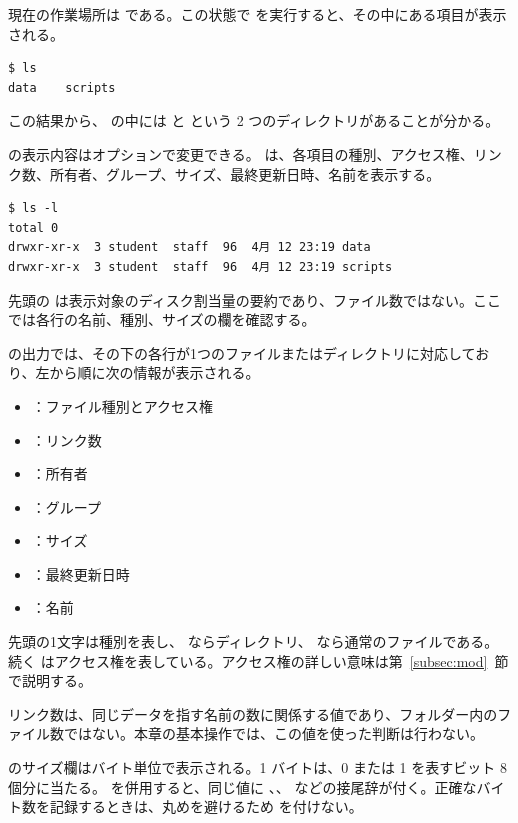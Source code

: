 現在の作業場所は  である。この状態で  を実行すると、その中にある項目が表示される。

\begin{lstlisting}[numbers=none, xleftmargin=2\zw]
$ ls
data	scripts
\end{lstlisting}

この結果から、 の中には  と  という 2 つのディレクトリがあることが分かる。

 の表示内容はオプションで変更できる。 は、各項目の種別、アクセス権、リンク数、所有者、グループ、サイズ、最終更新日時、名前を表示する。

\begin{lstlisting}[numbers=none, xleftmargin=2\zw]
$ ls -l
total 0
drwxr-xr-x  3 student  staff  96  4月 12 23:19 data
drwxr-xr-x  3 student  staff  96  4月 12 23:19 scripts
\end{lstlisting}

先頭の  は表示対象のディスク割当量の要約であり、ファイル数ではない。ここでは各行の名前、種別、サイズの欄を確認する。

 の出力では、その下の各行が1つのファイルまたはディレクトリに対応しており、左から順に次の情報が表示される。

\begin{itemize}
  \item {}：ファイル種別とアクセス権
  \item {}：リンク数
  \item {}：所有者
  \item {}：グループ
  \item {}：サイズ
  \item {}：最終更新日時
  \item {}：名前
\end{itemize}

先頭の1文字は種別を表し、 ならディレクトリ、\code{-} なら通常のファイルである。続く  はアクセス権を表している。アクセス権の詳しい意味は第~\ref{subsec:mod}~節で説明する。

リンク数は、同じデータを指す名前の数に関係する値であり、フォルダー内のファイル数ではない。本章の基本操作では、この値を使った判断は行わない。

 のサイズ欄はバイト単位で表示される。1 バイトは、0 または 1 を表すビット 8 個分に当たる。 を併用すると、同じ値に 、、 などの接尾辞が付く。正確なバイト数を記録するときは、丸めを避けるため  を付けない。

